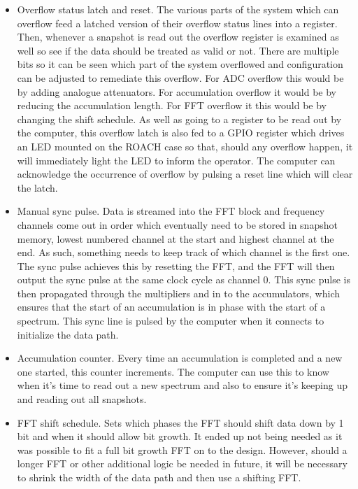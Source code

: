 \begin{itemize}
  \item Overflow status latch and reset. The various parts of the system which can overflow feed a latched version of their overflow status lines into a register. Then, whenever a snapshot is read out the overflow register is examined as well so see if the data should be treated as valid or not. There are multiple bits so it can be seen which part of the system overflowed and configuration can be adjusted to remediate this overflow. For ADC overflow this would be by adding analogue attenuators. For accumulation overflow it would be by reducing the accumulation length. For FFT overflow it this would be by changing the shift schedule. As well as going to a register to be read out by the computer, this overflow latch is also fed to a GPIO register which drives an LED mounted on the ROACH case so that, should any overflow happen, it will immediately light the LED to inform the operator. The computer can acknowledge the occurrence of overflow by pulsing a reset line which will clear the latch.
  \item Manual sync pulse. Data is streamed into the FFT block and frequency channels come out in order which eventually need to be stored in snapshot memory, lowest numbered channel at the start and highest channel at the end. As such, something needs to keep track of which channel is the first one. The sync pulse achieves this by resetting the FFT, and the FFT will then output the sync pulse at the same clock cycle as channel 0. This sync pulse is then propagated through the multipliers and in to the accumulators, which ensures that the start of an accumulation is in phase with the start of a spectrum. This sync line is pulsed by the computer when it connects to initialize the data path.
  \item Accumulation counter. Every time an accumulation is completed and a new one started, this counter increments. The computer can use this to know when it's time to read out a new spectrum and also to ensure it's keeping up and reading out all snapshots.
  \item FFT shift schedule. Sets which phases the FFT should shift data down by 1 bit and when it should allow bit growth. It ended up not being needed as it was possible to fit a full bit growth FFT on to the design. However, should a longer FFT or other additional logic be needed in future, it will be necessary to shrink the width of the data path and then use a shifting FFT.
\end{itemize}

